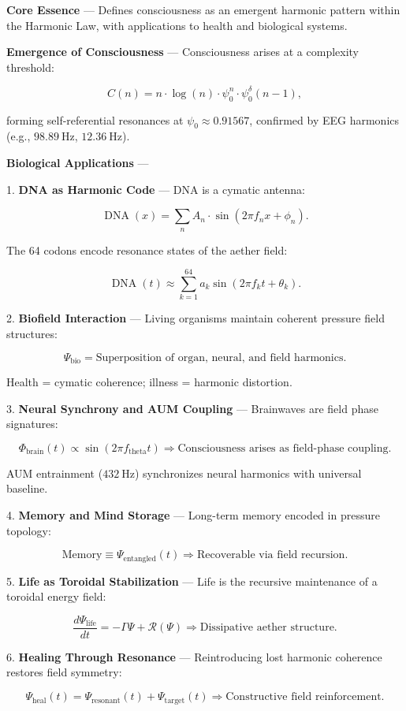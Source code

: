 
\textbf{Core Essence} --- Defines consciousness as an emergent harmonic pattern within the Harmonic Law, with applications to health and biological systems.

\textbf{Emergence of Consciousness} --- Consciousness arises at a complexity threshold:

$$
C(n) = n \cdot \log(n) \cdot \psi_0^n \cdot \psi_0^\delta(n-1),
$$

forming self-referential resonances at $\psi_0 \approx 0.91567$, confirmed by EEG harmonics (e.g., $98.89 \mathrm{~Hz}$, $12.36 \mathrm{~Hz}$).

\textbf{Biological Applications} ---

1. \textbf{DNA as Harmonic Code} --- DNA is a cymatic antenna:

$$
\operatorname{DNA}(x) = \sum_n A_n \cdot \sin \left( 2 \pi f_n x + \phi_n \right).
$$

The 64 codons encode resonance states of the aether field:

$$
\operatorname{DNA}(t) \approx \sum_{k=1}^{64} a_k \sin \left( 2 \pi f_k t + \theta_k \right).
$$

2. \textbf{Biofield Interaction} --- Living organisms maintain coherent pressure field structures:

$$
\Psi_{\text{bio}} = \text{Superposition of organ, neural, and field harmonics}.
$$

Health = cymatic coherence; illness = harmonic distortion.

3. \textbf{Neural Synchrony and AUM Coupling} --- Brainwaves are field phase signatures:

$$
\Phi_{\text{brain}}(t) \propto \sin \left( 2 \pi f_{\text{theta}} t \right) \Rightarrow \text{Consciousness arises as field-phase coupling}.
$$

AUM entrainment ($432 \mathrm{~Hz}$) synchronizes neural harmonics with universal baseline.

4. \textbf{Memory and Mind Storage} --- Long-term memory encoded in pressure topology:

$$
\text{Memory} \equiv \Psi_{\text{entangled}}(t) \Rightarrow \text{Recoverable via field recursion}.
$$

5. \textbf{Life as Toroidal Stabilization} --- Life is the recursive maintenance of a toroidal energy field:

$$
\frac{d \Psi_{\text{life}}}{d t} = -\Gamma \Psi + \mathcal{R}(\Psi) \Rightarrow \text{Dissipative aether structure}.
$$

6. \textbf{Healing Through Resonance} --- Reintroducing lost harmonic coherence restores field symmetry:

$$
\Psi_{\text{heal}}(t) = \Psi_{\text{resonant}}(t) + \Psi_{\text{target}}(t) \Rightarrow \text{Constructive field reinforcement}.
$$

